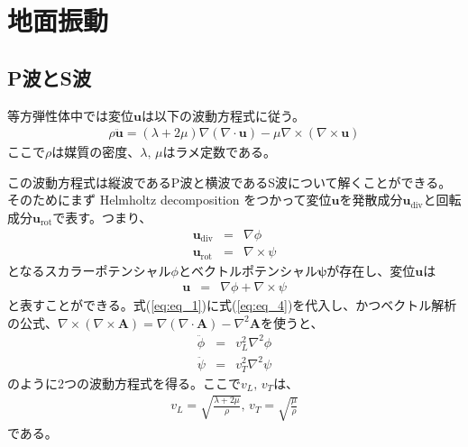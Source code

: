 
\section{地面振動}

\subsection{P波とS波}

等方弾性体中では変位$\bm{u}$は以下の波動方程式に従う。
\begin{eqnarray}\label{eq:eq_1}
  \rho{\bm{\ddot{u}}} = (\lambda+2\mu)\nabla(\nabla\cdot\bm{u}) - \mu\nabla\times(\nabla\times\bm{u})
\end{eqnarray}
ここで$\rho$は媒質の密度、$\lambda,\,\mu$はラメ定数である。

この波動方程式は縦波であるP波と横波であるS波について解くことができる。そのためにまず Helmholtz decomposition をつかって変位$\bm{u}$を発散成分$\bm{u}_{\mathrm{div}}$と回転成分$\bm{u}_{\mathrm{rot}}$で表す。つまり、
\begin{eqnarray}
  \bm{u}_{\mathrm{div}}&=&\nabla\phi \label{eq:eq_2}\\
  \bm{u}_{\mathrm{rot}}&=&\nabla\times\psi \label{eq:eq_3}
\end{eqnarray}
となるスカラーポテンシャル$\phi$とベクトルポテンシャル$\bm{\psi}$が存在し、変位$\bm{u}$は
\begin{eqnarray} 
  \bm{u} &=& \nabla\phi + \nabla\times\psi \label{eq:eq_4}
\end{eqnarray}
と表すことができる。式(\ref{eq:eq_1})に式(\ref{eq:eq_4})を代入し、かつベクトル解析の公式、$\nabla\times(\nabla\times\bm{A})=\nabla(\nabla\cdot\bm{A})-\nabla^2{\bm{A}}$を使うと、
\begin{eqnarray}
  \ddot{\phi} &=& v_{L}^2\nabla^2\phi \label{eq:eq_5}\\
  \ddot{\psi} &=& v_{T}^2\nabla^2\psi \label{eq:eq_6}
\end{eqnarray} 
のように2つの波動方程式を得る。ここで$v_{L},\,v_{T}$は、
\begin{eqnarray}
  v_{L} = \sqrt{\frac{\lambda+2\mu}{\rho}},\,v_{T} = \sqrt{\frac{\mu}{\rho}} \label{eq:eq_7}
\end{eqnarray} 
である。

